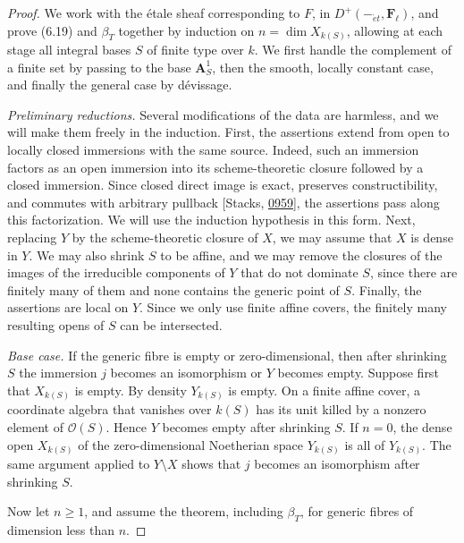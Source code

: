 \documentclass[11pt]{article}
\providecommand{\Fell}{}\renewcommand{\Fell}{\mathbf F_\ell}
\begin{document}
\begin{proof}[{Proof}]\label{bp564}%
We work with the étale sheaf corresponding to \(F\), in \(D^+(-_{\acute{e}t},\Fell)\), and prove (6.19) and \(\beta_T\) together by induction on \(n=\dim X_{k(S)}\), allowing at each stage all integral bases \(S\) of finite type over \(k\). We first handle the complement of a finite set by passing to the base \(\mathbf A^1_S\), then the smooth, locally constant case, and finally the general case by dévissage.

\emph{Preliminary reductions.} Several modifications of the data are harmless, and we will make them freely in the induction. First, the assertions extend from open to locally closed immersions with the same source. Indeed, such an immersion factors as an open immersion into its scheme-theoretic closure followed by a closed immersion. Since closed direct image is exact, preserves constructibility, and commutes with arbitrary pullback [Stacks, \href{https://stacks.math.columbia.edu/tag/0959}{0959}], the assertions pass along this factorization. We will use the induction hypothesis in this form. Next, replacing \(Y\) by the scheme-theoretic closure of \(X\), we may assume that \(X\) is dense in \(Y\). We may also shrink \(S\) to be affine, and we may remove the closures of the images of the irreducible components of \(Y\) that do not dominate \(S\), since there are finitely many of them and none contains the generic point of \(S\). Finally, the assertions are local on \(Y\). Since we only use finite affine covers, the finitely many resulting opens of \(S\) can be intersected.

\emph{Base case.} If the generic fibre is empty or zero-dimensional, then after shrinking \(S\) the immersion \(j\) becomes an isomorphism or \(Y\) becomes empty. Suppose first that \(X_{k(S)}\) is empty. By density \(Y_{k(S)}\) is empty. On a finite affine cover, a coordinate algebra that vanishes over \(k(S)\) has its unit killed by a nonzero element of \(\mathcal O(S)\). Hence \(Y\) becomes empty after shrinking \(S\). If \(n=0\), the dense open \(X_{k(S)}\) of the zero-dimensional Noetherian space \(Y_{k(S)}\) is all of \(Y_{k(S)}\). The same argument applied to \(Y\setminus X\) shows that \(j\) becomes an isomorphism after shrinking \(S\).

Now let \(n\geq1\), and assume the theorem, including \(\beta_T\), for generic fibres of dimension less than \(n\).


\end{proof}
\end{document}
